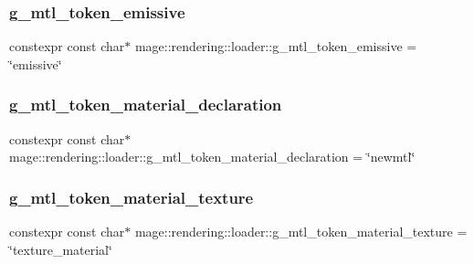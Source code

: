 \hypertarget{namespacemage_1_1rendering_1_1loader_ad8441c4e976324ee9ded45beb738b03a}{}\label{namespacemage_1_1rendering_1_1loader_ad8441c4e976324ee9ded45beb738b03a} 
\subsubsection{\texorpdfstring{g\+\_\+mtl\+\_\+token\+\_\+emissive}{g\_mtl\_token\_emissive}}
{\footnotesize\ttfamily constexpr const char$\ast$ mage\+::rendering\+::loader\+::g\+\_\+mtl\+\_\+token\+\_\+emissive = \char`\"{}emissive\char`\"{}}

\hypertarget{namespacemage_1_1rendering_1_1loader_a9633bbe8f29485e7bfa7cf5b709ebb1b}{}\label{namespacemage_1_1rendering_1_1loader_a9633bbe8f29485e7bfa7cf5b709ebb1b} 
\subsubsection{\texorpdfstring{g\+\_\+mtl\+\_\+token\+\_\+material\+\_\+declaration}{g\_mtl\_token\_material\_declaration}}
{\footnotesize\ttfamily constexpr const char$\ast$ mage\+::rendering\+::loader\+::g\+\_\+mtl\+\_\+token\+\_\+material\+\_\+declaration = \char`\"{}newmtl\char`\"{}}

\hypertarget{namespacemage_1_1rendering_1_1loader_aaa6c8970ee8fcc0ed3088f009d0e778d}{}\label{namespacemage_1_1rendering_1_1loader_aaa6c8970ee8fcc0ed3088f009d0e778d} 
\subsubsection{\texorpdfstring{g\+\_\+mtl\+\_\+token\+\_\+material\+\_\+texture}{g\_mtl\_token\_material\_texture}}
{\footnotesize\ttfamily constexpr const char$\ast$ mage\+::rendering\+::loader\+::g\+\_\+mtl\+\_\+token\+\_\+material\+\_\+texture = \char`\"{}texture\+\_\+material\char`\"{}}

